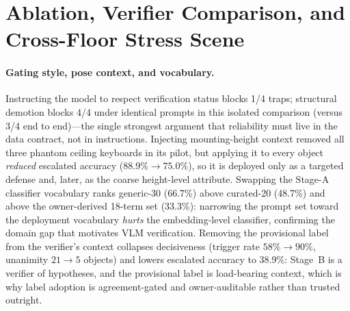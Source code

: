 \section{Ablation, Verifier Comparison, and Cross-Floor Stress Scene}
\label{sec:exp-ablation}

\paragraph{Gating style, pose context, and vocabulary.}
Instructing the model to respect verification status blocks 1/4 traps;
structural demotion blocks 4/4 under identical prompts in this isolated
comparison (versus 3/4 end to end)---the single strongest argument that
reliability must live in the data contract, not in instructions. Injecting
mounting-height context removed all three phantom ceiling keyboards in its
pilot, but applying it to every object \emph{reduced} escalated accuracy
($88.9\%\rightarrow75.0\%$), so it is deployed only as a targeted defense
and, later, as the coarse height-level attribute. Swapping the
Stage-A classifier vocabulary ranks generic-30 (66.7\%) above curated-20
(48.7\%) and above the owner-derived 18-term set (33.3\%): narrowing the prompt
set toward the deployment vocabulary \emph{hurts} the embedding-level
classifier, confirming the domain gap that motivates VLM verification.
Removing the provisional label from the verifier's context collapses
decisiveness (trigger rate $58\%\rightarrow90\%$, unanimity
$21\rightarrow5$ objects) and lowers escalated accuracy to 38.9\%: Stage~B is a
verifier of hypotheses, and the provisional label is load-bearing context,
which is why label adoption is agreement-gated and owner-auditable rather than
trusted outright.

